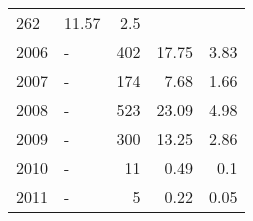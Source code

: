 \begin{longtable}{lXrrr}
       \num{262} &
       \num[round-mode=places,round-precision=2]{11,57} &
         \num[round-mode=places,round-precision=2]{2,5} \\

     2006 &
     \multicolumn{1}{X}{ -  } &


       \num{402} &
       \num[round-mode=places,round-precision=2]{17,75} &
         \num[round-mode=places,round-precision=2]{3,83} \\

     2007 &
     \multicolumn{1}{X}{ -  } &


       \num{174} &
       \num[round-mode=places,round-precision=2]{7,68} &
         \num[round-mode=places,round-precision=2]{1,66} \\

     2008 &
     \multicolumn{1}{X}{ -  } &


       \num{523} &
       \num[round-mode=places,round-precision=2]{23,09} &
         \num[round-mode=places,round-precision=2]{4,98} \\

     2009 &
     \multicolumn{1}{X}{ -  } &


       \num{300} &
       \num[round-mode=places,round-precision=2]{13,25} &
         \num[round-mode=places,round-precision=2]{2,86} \\

     2010 &
     \multicolumn{1}{X}{ -  } &


       \num{11} &
       \num[round-mode=places,round-precision=2]{0,49} &
         \num[round-mode=places,round-precision=2]{0,1} \\

     2011 &
     \multicolumn{1}{X}{ -  } &


       \num{5} &
       \num[round-mode=places,round-precision=2]{0,22} &
         \num[round-mode=places,round-precision=2]{0,05} \\


\end{longtable}
